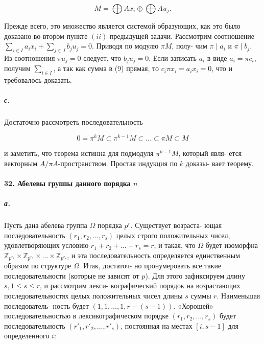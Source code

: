 \documentclass{mai_book}
\begin{document}
{\begin{equation*}
M = \bigoplus Ax_{i} \oplus \bigoplus Au_{j}.
\end{equation*}




\noindent Прежде всего, это множество является системой образующих, как это
было доказано во втором пункте $(ii)$ предыдущей задачи. Рассмотрим
соотношение $\sum_{i \in I}a_{i}x_{i} + \sum_{j \in J}b_{j}u_{j} = 0$. Приводя по модулю $\pi M$, полу-
чим $\pi\;|\;a_{i}$ и $\pi\;|\;b_{j}$. Из соотношения $\pi u_{j} = 0$ следует, что $b_{j}u_{j} = 0$. Если
записать $a_{i}$ в виде $a_{i} = \pi c_{i}$, получим $\sum_{i \in I}$, а так как сумма
в (9) прямая, то $c_{i}\pi x_{i} = a_{i}x_{i} = 0$, что и требовалось доказать.

\subparagraph{с.} Достаточно рассмотреть последовательность

\begin{equation*}
0 = \pi^{k}M \subset \pi^{k-1}M \subset\dots\subset \pi M \subset M
\end{equation*}

\noindent и заметить, что теорема истинна для подмодуля $\pi^{k-1}M$, который явля-
ется векторным $A/\pi A$-пространством. Простая индукция по $k$ доказы-
вает теорему.

\paragraph{32. Абелевы группы данного порядка $n$}

\subparagraph{а.} Пусть дана абелева группа $\Omega$ порядка $p^{r}$. Существует возраста-
ющая последовательность $(r_{1},r_{2},\ldots,r_{s})$ целых строго положительных
чисел, удовлетворяющих условию $r_{1} + r_{2} +\dots+ r_{s} = r$, и такая, что
$\Omega$ будет изоморфна $\mathbb {Z}_{p^{r_{1}}} \times \mathbb {Z}_{p^{r_{2}}} \times \dots \times \mathbb {Z}_{p^{r_{s}}}$, и эта последовательность
определяется единственным образом по структуре $\Omega$. Итак, достаточ-
но пронумеровать все такие последовательности (которые не зависят
от $p$). Для этого зафиксируем длину $s, 1 \leqslant s \leqslant r$, и рассмотрим лекси-
кографический порядок на возрастающих последовательностях целых
положительных чисел длины $s$ суммы $r$. Наименьшая последователь-
ность будет $(1,1,\ldots,1,r - (s - 1))$. «Хорошей» последовательностью в
лексикографическом порядке $(r_{1},r_{2},\ldots,r_{s})$ будет последовательность
$(r'_{1},r'_{2},\ldots,r'_{s})$, постоянная на местах $[i,s - 1]$ для определенного $i$:

}
\end{document}
